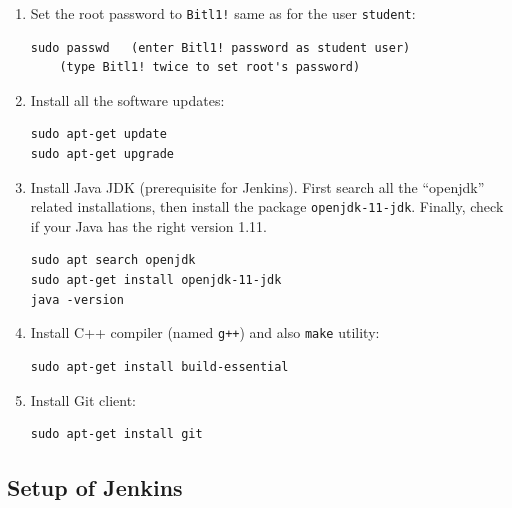\documentclass[11pt,a4paper]{article}
\begin{document}
\begin{enumerate}
\item Set the root password to {\tt Bitl1!} \textendash{} same as for the user {\tt student}:
\begin{verbatim}
sudo passwd   (enter Bitl1! password as student user)
    (type Bitl1! twice to set root's password)
\end{verbatim}
\item Install all the software updates:
\begin{verbatim}
sudo apt-get update
sudo apt-get upgrade
\end{verbatim}
\item Install Java JDK (prerequisite for Jenkins). First search all the ``openjdk'' related installations, 
then install the package {\tt openjdk-11-jdk}. Finally, check if your Java has the right version 1.11.
\begin{verbatim}
sudo apt search openjdk
sudo apt-get install openjdk-11-jdk
java -version
\end{verbatim}
\item Install C++ compiler (named {\tt g++}) and also {\tt make} utility:
\begin{verbatim}
sudo apt-get install build-essential
\end{verbatim}
\item Install Git client:
\begin{verbatim}
sudo apt-get install git
\end{verbatim}
\end{enumerate}



\subsection{Setup of Jenkins}
\end{document}
